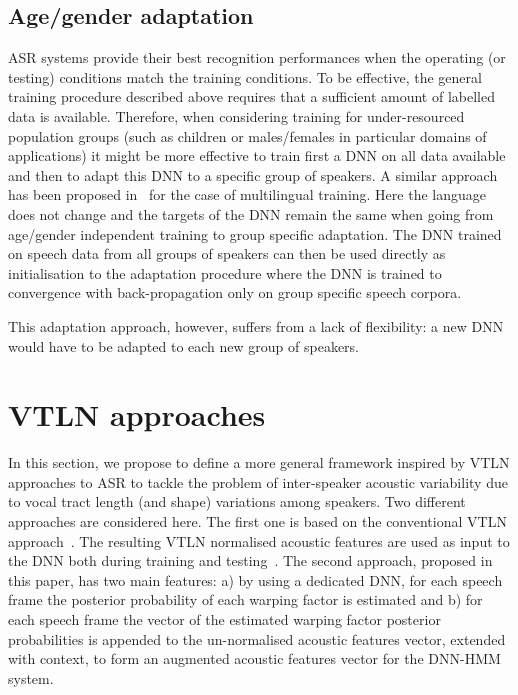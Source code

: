 \documentclass{nle}
\begin{document}
\subsection{Age/gender adaptation}
ASR  systems  provide their  best  recognition  performances when  the
operating  (or testing)  conditions match   the training
conditions.  To be effective, the general training procedure described
above requires that a sufficient  amount of labelled data is available.
Therefore,  when considering  training  for under-resourced  population groups
(such  as   children  or   males/females  in  particular   domains  of
applications) it  might be more  effective to train  first a DNN  on all
data available and then to adapt this DNN to a specific group of speakers. 
A similar approach has been proposed in~\citet{thomas13} for  the  case of  multilingual training.
Here the language  does not change and the targets of the DNN remain
the same when going from age/gender independent training to group
  specific adaptation.  The DNN trained on speech data from all groups
  of  speakers can  then be  used  directly as  initialisation to  the
  adaptation  procedure where  the DNN  is trained  to convergence
  with back-propagation only on group specific speech corpora.
  
This adaptation approach, however, suffers from a lack of flexibility: 
a new DNN would have to be adapted to each new group of speakers.
  
\section{VTLN approaches}\label{section:VTLN}
In this section, we propose to define a more general framework inspired by VTLN approaches to ASR to tackle the problem of inter-speaker acoustic variability due to
vocal tract  length (and shape)  variations among speakers. Two different approaches are considered here. The  first  one  is  based  on  the
conventional   VTLN  approach~\citep{EidGis96,LeeRos96,WegMcaOrlPek96}.
The resulting VTLN  normalised acoustic features are used  as input to
the  DNN both during  training and  testing~\citep{seide11}.  The
second approach, proposed in this  paper, has two main features: a) by
using a dedicated DNN, for each speech frame the posterior probability
of each warping  factor is estimated and b) for  each speech frame the
vector  of the  estimated  warping factor  posterior probabilities  is
appended to  the un-normalised acoustic features  vector, extended with
context, to form an augmented  acoustic features vector for the DNN-HMM
system.
\end{document}
